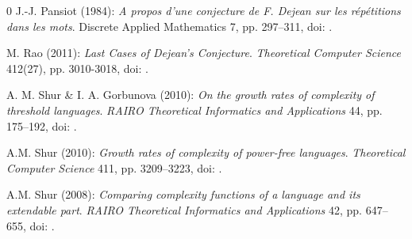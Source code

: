 \documentclass[submission,copyright]{eptcs}\providecommand{\event}{WORDS 2011}
\begin{document}
\begin {thebibliography} {0}
J.-J. Pansiot (1984): {\it A propos d'une conjecture de F. Dejean sur les r\'ep\'etitions dans les mots}. {Discrete Applied Mathematics} 7, pp. 297--311, doi: .

M. Rao (2011): {\it Last Cases of Dejean's Conjecture}. {\slshape Theoretical Computer Science} 412(27), pp. 3010-3018, doi: .

A. M. Shur \& I. A. Gorbunova (2010): {\it On the growth rates of complexity of threshold languages}. {\slshape RAIRO Theoretical Informatics and Applications} 44, pp. 175--192, doi: .

A.M. Shur (2010): {\it Growth rates of complexity of power-free languages}. {\slshape Theoretical Computer Science} 411, pp. 3209--3223, doi: .

A.M. Shur (2008): {\it Comparing complexity functions of a language and its extendable part}. {\slshape RAIRO Theore\-tical Informatics and Applications } 42, pp. 647--655, doi: .
\end {thebibliography}
\end{document}
